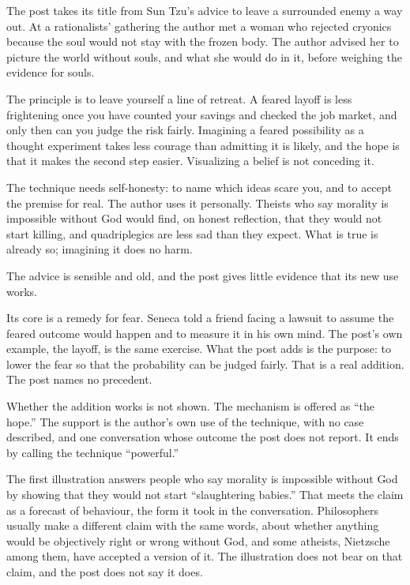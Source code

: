 \begin{afterword}
\summaryhead

The post takes its title from Sun Tzu's advice to leave a surrounded enemy a way out. At a rationalists' gathering the author met a woman who rejected cryonics because the soul would not stay with the frozen body. The author advised her to picture the world without souls, and what she would do in it, before weighing the evidence for souls.

The principle is to leave yourself a line of retreat. A feared layoff is less frightening once you have counted your savings and checked the job market, and only then can you judge the risk fairly. Imagining a feared possibility as a thought experiment takes less courage than admitting it is likely, and the hope is that it makes the second step easier. Visualizing a belief is not conceding it.

The technique needs self-honesty: to name which ideas scare you, and to accept the premise for real. The author uses it personally. Theists who say morality is impossible without God would find, on honest reflection, that they would not start killing, and quadriplegics are less sad than they expect. What is true is already so; imagining it does no harm.

\responsehead

The advice is sensible and old, and the post gives little evidence that its new use works.

Its core is a remedy for fear. Seneca told a friend facing a lawsuit to assume the feared outcome would happen and to measure it in his own mind. The post's own example, the layoff, is the same exercise. What the post adds is the purpose: to lower the fear so that the probability can be judged fairly. That is a real addition. The post names no precedent.

Whether the addition works is not shown. The mechanism is offered as ``the hope.'' The support is the author's own use of the technique, with no case described, and one conversation whose outcome the post does not report. It ends by calling the technique ``powerful.''

The first illustration answers people who say morality is impossible without God by showing that they would not start ``slaughtering babies.'' That meets the claim as a forecast of behaviour, the form it took in the conversation. Philosophers usually make a different claim with the same words, about whether anything would be objectively right or wrong without God, and some atheists, Nietzsche among them, have accepted a version of it. The illustration does not bear on that claim, and the post does not say it does.


\end{afterword}
